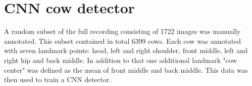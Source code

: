 \documentclass[10pt,a4paper,twocolumn]{article}
\begin{document}
%
%
%

\section{CNN cow detector}

A random subset of the full recording consisting of 1722 images was manually annotated. This subset contained in total 6399 cows. Each cow was annotated with seven landmark points: head, left and right shoulder, front middle, left and right hip and back middle. In addition to that one additional landmark "cow center" was defined as the mean of front middle and back middle. This data was then used to train a CNN detector.
\end{document}

